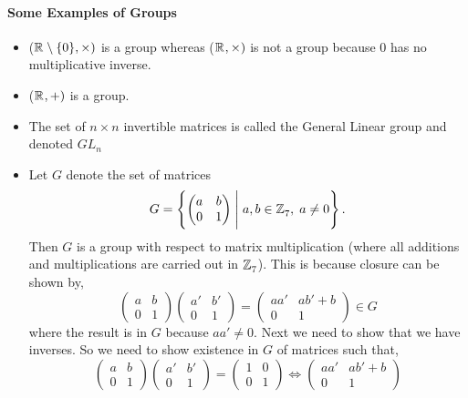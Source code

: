 \documentclass[MathsNotesBase.tex]{subfiles}
\begin{document}
{	\paragraph*{Some Examples of Groups}
	\begin{itemize}
	\item{ ($\mathbb{R}^{} \setminus \{0\}, \times)$ } is a group whereas ($\mathbb{R}^{}, \times)$ is not a group because $0$ has no multiplicative inverse.
	\item{ ($\mathbb{R}^{}, +)$ } is a group.
	\item{ The set of $n \times n$ invertible matrices is called the General Linear group and denoted $GL_n$  }
	\item{Let $G$ denote the set of matrices
		\[ G = \left\{
			\begin{pmatrix}
				a & b \\
				0 & 1
			\end{pmatrix}
		\; \middle\vert \; a,b \in \mathbb{Z}^{}_7, \; a \neq 0 \right\}. \]
		Then $G$ is a group with respect to matrix multiplication (where all additions and multiplications are carried out in $\mathbb{Z}^{}_7$). This is because closure can be shown by,
		\[
			\begin{pmatrix}
			a & b \\
			0 & 1
			\end{pmatrix}
			\begin{pmatrix}
			a' & b' \\
			0 & 1
			\end{pmatrix}
			=
			\begin{pmatrix}
			aa' & ab' + b \\
			0 & 1
			\end{pmatrix} \in G
		\]
		where the result is in $G$ because ${ aa' \neq 0 }$. Next we need to show that we have inverses. So we need to show existence in $G$ of matrices such that,
		\[
			\begin{pmatrix}
			a & b \\
			0 & 1
			\end{pmatrix}
			\begin{pmatrix}
			a' & b' \\
			0 & 1
			\end{pmatrix}
			=
			\begin{pmatrix}
			1 & 0 \\
			0 & 1
			\end{pmatrix} 
			\iff
			\begin{pmatrix}
			aa' & ab' + b \\
			0 & 1
			\end{pmatrix}
\]}
\end{itemize}}
\end{document}
